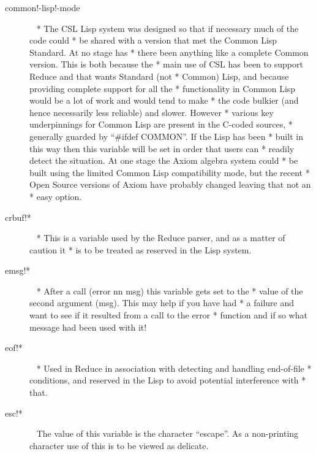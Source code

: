 \documentclass[a4paper,11pt]{article}
\begin{document}
\begin{description}
\item [{\ttfamily common!-lisp!-mode}]  ~\newline
  * The CSL Lisp system was designed so that if necessary much of the code could
  * be shared with a version that met the Common Lisp Standard. At no stage has
  * there been anything like a complete Common version. This is both because the
  * main use of CSL has been to support Reduce and that wants Standard (not
  * Common) Lisp, and because providing complete support for all the
  * functionality in Common Lisp would be a lot of work and would tend to make
  * the code bulkier (and hence necessarily less reliable) and slower. However
  * various key underpinnings for Common Lisp are present in the C-coded sources,
  * generally guarded by ``{\ttfamily \#ifdef COMMON}''. If the Lisp has been
  * built in this way then this variable will be set in order that users can
  * readily detect the situation.  At one stage the Axiom algebra system could
  * be built using the limited Common Lisp compatibility mode, but the recent
  * Open Source versions of Axiom have probably changed leaving that not an
  * easy option.

\item [{\ttfamily crbuf!*}]  ~\newline
  * This is a variable used by the Reduce parser, and as a matter of caution it
  * is to be treated as reserved in the Lisp system.

\item [{\ttfamily emsg!*}]  ~\newline
  * After a call {\ttfamily (error nn msg)} this variable gets set to the
  * value of the second argument ({\ttfamily msg}). This may help if you have had
  * a failure and want to see if it resulted from a call to the {\ttfamily error}
  * function and if so what message had been used with it!

\item [{\ttfamily eof!*}]  ~\newline
  * Used in Reduce in association with detecting and handling end-of-file
  * conditions, and reserved in the Lisp to avoid potential interference with
  * that.

\item [{\ttfamily esc!*}]  ~\newline
The value of this variable is the character ``escape''. As a non-printing
character use of this is to be viewed as delicate.


\end{description}
\end{document}

